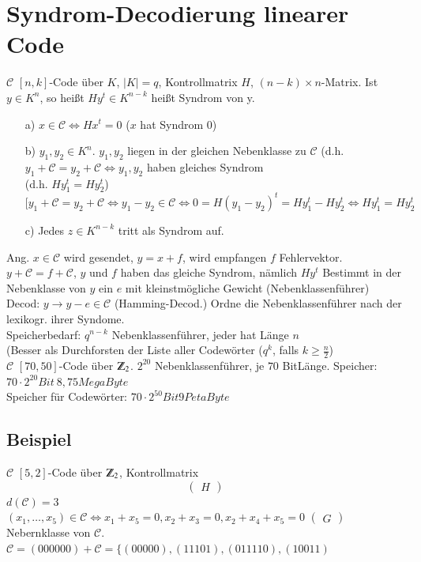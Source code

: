 \section{Syndrom-Decodierung linearer Code}
$\mathcal{C}$ $[n,k]$-Code \"uber $K$, $\left| K \right| = q$, Kontrollmatrix $H$, $(n-k) \times n$-Matrix. Ist $y \in K^n$, so hei\ss t $Hy^t \in K^{n-k}$ hei\ss t Syndrom von y.
\begin{itemize}
	\item[a)]	$x \in \mathcal{C} \Leftrightarrow Hx^t = 0$ ($x$ hat Syndrom $0$)
	\item[b)] $y_1,y_2 \in K^n$. $y_1,y_2$ liegen in der gleichen Nebenklasse zu $\mathcal{C}$ (d.h. $y_1 + \mathcal{C} = y_2 + \mathcal{C} \Leftrightarrow y_1,y_2$ haben gleiches Syndrom \\
	(d.h. $Hy_1^t = Hy_2^t$)
	\[
		[y_1 + \mathcal{C} = y_2 + \mathcal{C} \Leftrightarrow y_1 - y_2 \in \mathcal{C} \Leftrightarrow 0 = H(y_1 - y_2)^t = Hy_1^t - Hy_2^t \Leftrightarrow Hy_1^t = Hy_2^t
	\]
	\item[c)] Jedes $z \in K^{n-k}$ tritt als Syndrom auf.	 
\end{itemize}
Ang. $x \in \mathcal{C}$ wird gesendet, $y=x+f$, wird empfangen $f$ Fehlervektor. $y + \mathcal{C} = f + \mathcal{C}$, $y$ und $f$ haben das gleiche Syndrom, n\"amlich $Hy^t$
Bestimmt in der Nebenklasse von $y$ ein $e$ mit kleinstm\"ogliche Gewicht (Nebenklassenf\"uhrer) \\
Decod: $y \rightarrow y - e \in \mathcal{C}$ (Hamming-Decod.)
Ordne die Nebenklassenf\"uhrer nach der lexikogr. ihrer Syndome. \\
Speicherbedarf: $q^{n-k}$ Nebenklassenf\"uhrer, jeder hat L\"ange $n$ \\
(Besser als Durchforsten der Liste aller Codew\"orter ($q^k$, falls $k \geq \frac{n}{2}$)\\
$\mathcal{C}$ $[70,50]$-Code \"uber $\Z_2$. $2^{20}$ Nebenklassenf\"uhrer, je $70$ BitL\"ange. Speicher: $70 \cdot 2^{20} Bit ~ 8,75 MegaByte$ \\
Speicher f\"ur Codew\"orter: $70 \cdot 2^{50} Bit 9 PetaByte$
%
%
\subsection{Beispiel}
$\mathcal{C}$ $[5,2]$-Code \"uber $\Z_2$, Kontrollmatrix
\[
	\begin{pmatrix}
		H
	\end{pmatrix}
\]
$d(\mathcal{C})=3$\\
$(x_1,\ldots,x_5) \in \mathcal{C} \Leftrightarrow x_1+x_5 = 0, x_2+x_3=0,x_2+x_4+x_5=0$
$\begin{pmatrix}
	G
\end{pmatrix}
$
Nebernklasse von $\mathcal{C}$.\\
$\mathcal{C} = (000000) + \mathcal{C} = \lbrace (00000),(11101),(011110),(10011)$

